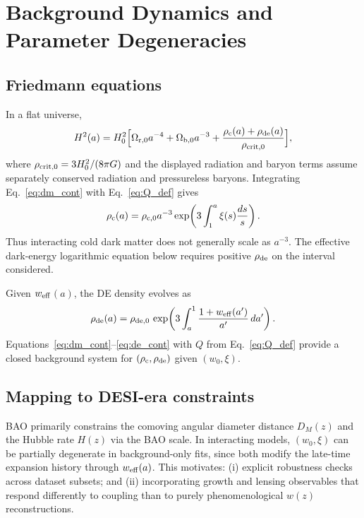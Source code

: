 \documentclass[reprint,aps,prd,nofootinbib,superscriptaddress]{revtex4-2}
\newcommand{\wz}{\ensuremath{w(z)}\xspace}
\newcommand{\weff}{\ensuremath{w_{\rm eff}}\xspace}
\begin{document}
\section{Background Dynamics and Parameter Degeneracies}
\label{sec:background}

\subsection{Friedmann equations}

In a flat universe,
\begin{equation}
H^2(a) = H_0^2\Big[\Omega_{\rm r,0}a^{-4}
+ \Omega_{\rm b,0}a^{-3}
+ \frac{\rho_{\rm c}(a)+\rho_{\rm de}(a)}{\rho_{\rm crit,0}}\Big],
\end{equation}
where $\rho_{\rm crit,0}=3H_0^2/(8\pi G)$ and the displayed radiation and baryon terms assume separately conserved radiation and pressureless baryons. Integrating Eq.~\eqref{eq:dm_cont} with Eq.~\eqref{eq:Q_def} gives
\begin{equation}
\rho_{\rm c}(a)=\rho_{\rm c,0}a^{-3}
\exp\!\left(3\int_1^a \xi(s)\frac{ds}{s}\right).
\end{equation}
Thus interacting cold dark matter does not generally scale as $a^{-3}$. The effective dark-energy logarithmic equation below requires positive $\rho_{\rm de}$ on the interval considered.

Given \weff$(a)$, the DE density evolves as
\begin{equation}
\rho_{\rm de}(a) = \rho_{\rm de,0}\,
\exp\!\left(3\int_a^1 \frac{1+\weff(a')}{a'}\,da'\right).
\label{eq:rde}
\end{equation}
Equations~\eqref{eq:dm_cont}--\eqref{eq:de_cont} with $Q$ from Eq.~\eqref{eq:Q_def} provide a closed background system for $(\rho_{\rm c},\rho_{\rm de})$ given $(w_0,\xi)$.

\subsection{Mapping to DESI-era constraints}

BAO primarily constrains the comoving angular diameter distance $D_M(z)$ and the Hubble rate $H(z)$ via the BAO scale.
In interacting models, $(w_0,\xi)$ can be partially degenerate in background-only fits, since both modify the late-time expansion history through $\weff(a)$.
This motivates: (i) explicit robustness checks across dataset subsets; and (ii) incorporating growth and lensing observables that respond differently to coupling than to purely phenomenological \wz reconstructions.
\end{document}
